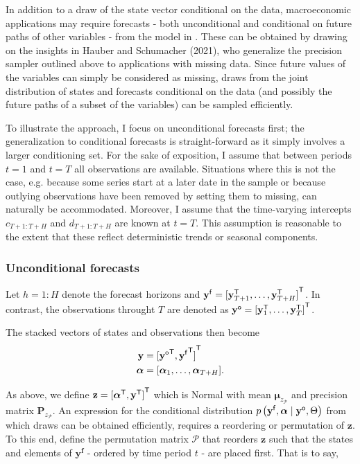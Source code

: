 \documentclass[notitlepage,a4paper,12pt]{article}
\newcommand{\transpose}[1]{{#1}^{\sf{T}}}
\begin{document}
In addition to a draw of the state vector conditional on the data, macroeconomic applications may require forecasts - both unconditional and conditional on future paths of other variables - from the model in . 
These can be obtained by drawing on the insights in Hauber and Schumacher (2021), who generalize the precision sampler outlined above to applications with missing data. Since future values of the variables can simply be considered as missing, draws from the joint distribution of states and forecasts conditional on the data (and possibly the future paths of a subset of the variables) can be sampled efficiently. 

To illustrate the approach, I focus on unconditional forecasts first; the generalization to conditional forecasts is straight-forward as it simply involves a larger conditioning set. For the sake of exposition, I assume that between periods $t=1$ and $t=T$ all observations are available. Situations where this is not the case, e.g. because some series start at a later date in the sample or because outlying observations have been removed by setting them to missing, can naturally be accommodated. Moreover, I assume that the time-varying intercepts $c_{T+1:T+H}$ and $d_{T+1:T+H}$ are known at $t=T$. This assumption is reasonable to the extent that these reflect deterministic trends or seasonal components. 

\subsubsection{Unconditional forecasts}\label{sec:uncondfcast}

Let $h = 1:H$ denote the forecast horizons and $\mathbf{y}^{\sf{f}} = \transpose{[\mathbf{y}^{\sf{T}}_{T+1}, \dots, \mathbf{y}^{\sf{T}}_{T+H}]}$. In contrast, the observations throught $T$ are denoted as $\mathbf{y}^{\sf{o}} = \transpose{[\mathbf{y}^{\sf{T}}_{1}, \dots, \mathbf{y}^{\sf{T}}_{T}]}$. 

The stacked vectors of states and observations then become
\begin{align*}
\mathbf{y} &= \transpose{[\transpose{\mathbf{y}^{\sf{o}}}, \transpose{\mathbf{y}^{\sf{f}}}]} \\
\boldsymbol{\alpha} &= [\boldsymbol{\alpha}_1, \dots, \boldsymbol{\alpha}_{T+H}].
\end{align*}

As above, we define $\mathbf{z} = \transpose{[\transpose{\boldsymbol{\alpha}}, \transpose{\mathbf{y}}]}$ which is Normal with mean $\boldsymbol{\mu}_{z_\mathcal{P}}$ and precision matrix $\mathbf{P}_{z_\mathcal{P}}$. An expression for the conditional distribution $p\left(\mathbf{y}^{\sf{f}}, \boldsymbol{\alpha} \mid \mathbf{y}^{\sf{o}}, \Theta \right)$ from which draws can be obtained efficiently, requires a reordering or permutation of $\mathbf{z}$. To this end, define the permutation matrix $\mathcal{P}$ that reorders $\mathbf{z}$ such that the states and elements of $\mathbf{y^f}$ - ordered by time period $t$ - are placed first. That is to say,
\end{document}
